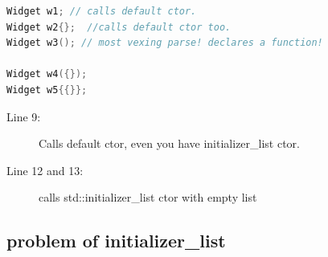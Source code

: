 \documentclass[a4paper,11pt,twoside]{book}
\begin{document}
\begin{itemize}
\begin{lstlisting}[frame=single, language=c++,mathescape=true]
Widget w1; // calls default ctor.
Widget w2{};  //calls default ctor too.
Widget w3(); // most vexing parse! declares a function!
	
Widget w4({}); 
Widget w5{{}}; 
\end{lstlisting}
\begin{description}
	\item[Line 9:] Calls default ctor, even  you have  initializer\_list ctor.
	\item[Line 12 and 13:] calls std::initializer\_list ctor with empty list
\end{description}
	
	\end{itemize}
	
\subsection{problem of initializer\_list}
	
\end{document}
